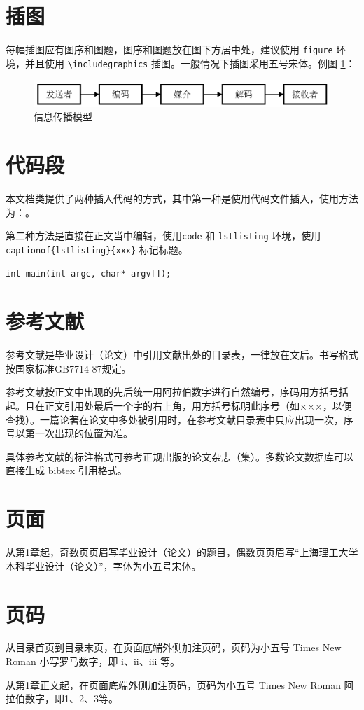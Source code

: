 \section{插图}
\par 每幅插图应有图序和图题，图序和图题放在图下方居中处，建议使用 \verb|figure| 环境，并且使用 \verb|\includegraphics| 插图。一般情况下插图采用五号宋体。例图 \ref{figure:model}：

\begin{figure}[htb]
    \figureCapSet
    \centering
    \includegraphics[width=.8\linewidth]{figure/egf.png}
    \caption{信息传播模型}
    \label{figure:model}
\end{figure}

\section{代码段}
\par 本文档类提供了两种插入代码的方式，其中第一种是使用代码文件插入，使用方法为：\lstinline||。
\codeCapSet


\par 第二种方法是直接在正文当中编辑，使用\lstinline|code| 和 \lstinline|lstlisting| 环境，使用 \lstinline|captionof{lstlisting}{xxx}| 标记标题。
\begin{code}
\begin{lstlisting}
int main(int argc, char* argv[]);
\end{lstlisting}
\end{code}

\section{参考文献}

\par 参考文献是毕业设计（论文）中引用文献出处的目录表，一律放在文后。书写格式按国家标准GB7714-87规定。
\par 参考文献按正文中出现的先后统一用阿拉伯数字进行自然编号，序码用方括号括起。且在正文引用处最后一个字的右上角，用方括号标明此序号（如×××\cite{论文}，以便查找）。一篇论著在论文中多处被引用时，在参考文献目录表中只应出现一次，序号以第一次出现的位置为准。
\par 具体参考文献的标注格式可参考正规出版的论文杂志（集）。多数论文数据库可以直接生成 bibtex 引用格式。

\section{页面}
\par 从第1章起，奇数页页眉写毕业设计（论文）的题目，偶数页页眉写“上海理工大学本科毕业设计（论文）”，字体为小五号宋体。

\section{页码}
\par 从目录首页到目录末页，在页面底端外侧加注页码，页码为小五号 Times New Roman 小写罗马数字，即 i、ii、iii 等。
\par 从第1章正文起，在页面底端外侧加注页码，页码为小五号 Times New Roman 阿拉伯数字，即1、2、3等。

